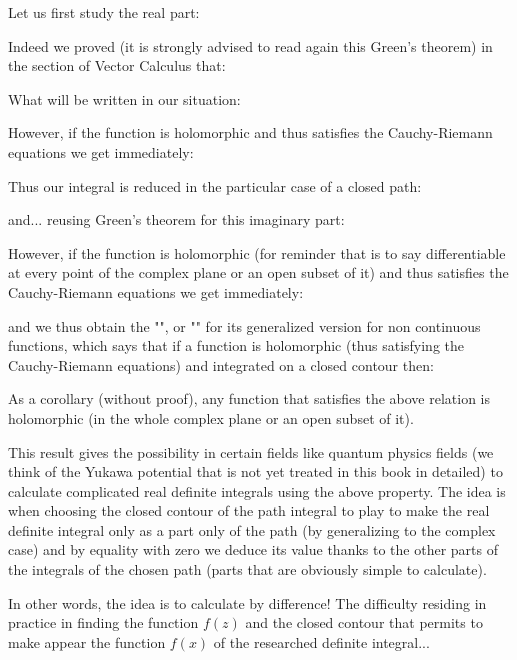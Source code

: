 	Let us first study the real part:
	
	Indeed we proved (it is strongly advised to read again this Green's theorem) in the section of Vector Calculus that:
	
	What will be written in our situation:
	
	However, if the function is holomorphic and thus satisfies the Cauchy-Riemann equations we get immediately:
	
	Thus our integral is reduced in the particular case of a closed path:
	
	and... reusing Green's theorem for this imaginary part:
	
	However, if the function is holomorphic (for reminder that is to say differentiable at every point of the complex plane or an open subset of it) and thus satisfies the Cauchy-Riemann equations we get immediately:
	
	and we thus obtain the "", or "" for its generalized version for non continuous functions, which says that if a function is holomorphic (thus satisfying the Cauchy-Riemann equations) and integrated on a closed contour then:
	
	As a corollary (without proof), any function that satisfies the above relation is holomorphic (in the whole complex plane or an open subset of it).
	
	This result gives the possibility in certain fields like quantum physics fields (we think of the Yukawa potential that is not yet treated in this book in detailed) to calculate complicated real definite integrals using the above property. The idea is when choosing the closed contour of the path integral to play to make the real definite integral only as a part only of the path (by generalizing to the complex case) and by equality with zero we deduce its value thanks to the other parts of the integrals of the chosen path (parts that are obviously simple to calculate).
	
	In other words, the idea is to calculate by difference! The difficulty residing in practice in finding the function $f (z)$ and the closed contour that permits to make appear the function $f (x) $ of the researched definite integral...
	
